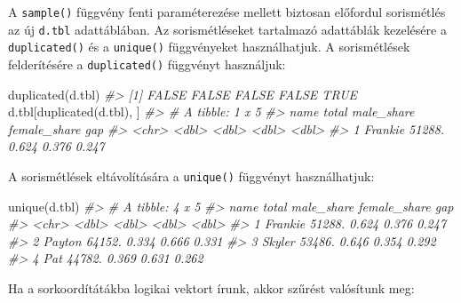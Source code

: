 \documentclass[
]{book}
\newenvironment{Shaded}{\begin{snugshade}}{\end{snugshade}}
\newcommand{\CommentTok}[1]{\textcolor[rgb]{0.56,0.35,0.01}{\textit{#1}}}
\newcommand{\FunctionTok}[1]{\textcolor[rgb]{0.00,0.00,0.00}{#1}}
\newcommand{\NormalTok}[1]{#1}
\begin{document}
A \texttt{sample()} függvény fenti paraméterezése mellett biztosan előfordul sorismétlés az új \texttt{d.tbl} adattáblában.
Az sorismétléseket tartalmazó adattáblák kezelésére a \texttt{duplicated()} és a \texttt{unique()} függvényeket használhatjuk. A sorismétlések felderítésére a \texttt{duplicated()} függvényt használjuk:

\begin{Shaded}
\begin{Highlighting}[]
\FunctionTok{duplicated}\NormalTok{(d.tbl)}
\CommentTok{\#\textgreater{} [1] FALSE FALSE FALSE FALSE  TRUE}
\NormalTok{d.tbl[}\FunctionTok{duplicated}\NormalTok{(d.tbl), ]}
\CommentTok{\#\textgreater{} \# A tibble: 1 x 5}
\CommentTok{\#\textgreater{}   name     total male\_share female\_share   gap}
\CommentTok{\#\textgreater{}   \textless{}chr\textgreater{}    \textless{}dbl\textgreater{}      \textless{}dbl\textgreater{}        \textless{}dbl\textgreater{} \textless{}dbl\textgreater{}}
\CommentTok{\#\textgreater{} 1 Frankie 51288.      0.624        0.376 0.247}
\end{Highlighting}
\end{Shaded}

A sorismétlések eltávolítására a \texttt{unique()} függvényt használhatjuk:

\begin{Shaded}
\begin{Highlighting}[]
\FunctionTok{unique}\NormalTok{(d.tbl)}
\CommentTok{\#\textgreater{} \# A tibble: 4 x 5}
\CommentTok{\#\textgreater{}   name     total male\_share female\_share   gap}
\CommentTok{\#\textgreater{}   \textless{}chr\textgreater{}    \textless{}dbl\textgreater{}      \textless{}dbl\textgreater{}        \textless{}dbl\textgreater{} \textless{}dbl\textgreater{}}
\CommentTok{\#\textgreater{} 1 Frankie 51288.      0.624        0.376 0.247}
\CommentTok{\#\textgreater{} 2 Payton  64152.      0.334        0.666 0.331}
\CommentTok{\#\textgreater{} 3 Skyler  53486.      0.646        0.354 0.292}
\CommentTok{\#\textgreater{} 4 Pat     44782.      0.369        0.631 0.262}
\end{Highlighting}
\end{Shaded}

Ha a sorkoordítátákba logikai vektort írunk, akkor szűrést valósítunk meg:
\end{document}
